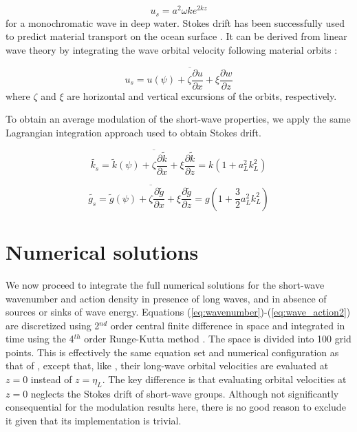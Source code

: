 \documentclass[draft]{agujournal2019}
\begin{document}
\begin{equation}
\label{}
u_s = a^2 \omega k e^{2kz}
\end{equation}
for a monochromatic wave in deep water.
Stokes drift has been successfully used to predict material transport on the
ocean surface \cite{rohrs2012observation,curcic2016hurricane}.
It can be derived from linear wave theory by integrating the wave orbital
velocity following material orbits \cite{phillips1966dynamics}:

\begin{equation}
\label{eq:lagrangian_average}
u_s = \overline{
  u(\psi) + 
  \zeta \dfrac{\partial u}{\partial x} +
  \xi \dfrac{\partial w}{\partial z}
}
\end{equation}
where $\zeta$ and $\xi$ are horizontal and vertical excursions of the orbits,
respectively.

To obtain an average modulation of the short-wave properties, we apply the same
Lagrangian integration approach used to obtain Stokes drift.

\begin{equation}
\label{eq:stokes_wavenumber}
\widetilde{k_s} = \overline{
  \widetilde{k}(\psi) +
  \zeta \dfrac{\partial \widetilde{k}}{\partial x} +
  \xi \dfrac{\partial \widetilde{k}}{\partial z}
}
= k \left( 1 + a_L^2 k_L^2 \right)
\end{equation}

\begin{equation}
\label{eq:stokes_gravity}
\widetilde{g_s} = \overline{
  \widetilde{g}(\psi) +
  \zeta \dfrac{\partial \widetilde{g}}{\partial x} +
  \xi \dfrac{\partial \widetilde{g}}{\partial z}
}
= g \left( 1 + \dfrac{3}{2} a_L^2 k_L^2 \right)
\end{equation}

\section{Numerical solutions}
\label{section:numerical_solutions}

We now proceed to integrate the full numerical solutions for the short-wave
wavenumber and action density in presence of long waves, and in absence of
sources or sinks of wave energy.
Equations (\ref{eq:wavenumber})-(\ref{eq:wave_action2}) are discretized using
2$^{nd}$  order central finite difference in space and integrated in time using the
4$^{th}$ order Runge-Kutta method \cite{butcher1996runge}.
The space is divided into 100 grid points.
This is effectively the same equation set and numerical configuration as that of
, except that, like , their
long-wave orbital velocities are evaluated at $z=0$ instead of $z=\eta_L$.
The key difference is that evaluating orbital velocities at $z=0$ neglects the
Stokes drift of short-wave groups.
Although not significantly consequential for the modulation results here, there
is no good reason to exclude it given that its implementation is trivial.
\end{document}
